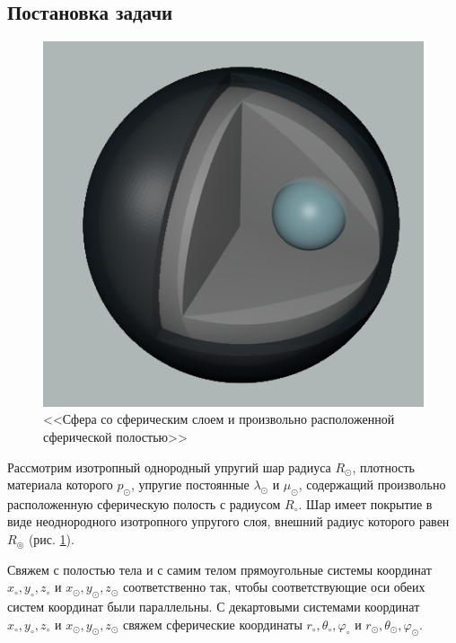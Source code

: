 \subsection{Постановка задачи}
\begin{figure}[h]
\begin{center}
\begin{minipage}[h]{0.47\linewidth}
\includegraphics[width=1\linewidth]{sphere_edited.png}
\caption{<<Сфера со сферическим слоем и произвольно расположенной сферической полостью>>}\label{pic_1}
\end{minipage}
\end{center}
\end{figure}

Рассмотрим изотропный однородный упругий шар радиуса $R_\odot$, плотность материала которого $p_\odot$, упругие постоянные $\lambda_\odot$ и $\mu_\odot$, содержащий произвольно расположенную сферическую полость с радиусом $R_\circ$. Шар имеет покрытие в виде неоднородного изотропного упругого слоя, внешний радиус которого равен $R_\circledcirc$ (рис. \cref{pic_1}).
 
Свяжем с полостью тела и с самим телом прямоугольные системы координат $x_\circ, y_\circ, z_\circ$ и $x_\odot, y_\odot, z_\odot$ соответственно так, чтобы соответствующие оси обеих систем координат были параллельны. С декартовыми системами координат $x_\circ, y_\circ, z_\circ$ и $x_\odot, y_\odot, z_\odot$ свяжем сферические координаты $r_\circ, \theta_\circ, \varphi_\circ$ и $r_\odot, \theta_\odot, \varphi_\odot$.

